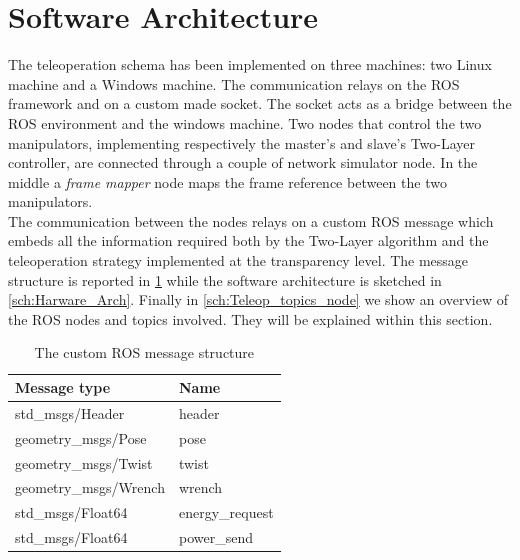 \section{Software Architecture}\label{GeneralArchitecture}
The teleoperation schema has been implemented on three machines: two Linux machine and a Windows machine.
The communication relays on the ROS framework and on a custom made socket.
The socket acts as a bridge between the ROS environment and the windows machine.
Two nodes that control the two manipulators, implementing respectively the master's and slave's Two-Layer controller, are connected through a couple of network simulator node.
In the middle a \textit{frame mapper} node maps the frame reference between the two manipulators.\\
The communication between the nodes relays on a custom ROS message which embeds all the information required both by the Two-Layer algorithm and the teleoperation strategy implemented at the transparency level.
The message structure is reported in \tablename{ \ref{message}} while the software architecture is sketched in \figurename{ \ref{sch:Harware_Arch}}.
Finally in \figurename{ \ref{sch:Teleop_topics_node}} we show an overview of the ROS nodes and topics involved. They will be explained within this section.
\begin{table}
\centering
\begin{tabular}{l l}
	\toprule
	\textbf{Message type} & \textbf{Name} \\ 
	\midrule
	std\_msgs/Header & header \\ 	
	geometry\_msgs/Pose & pose \\ 	
	geometry\_msgs/Twist & twist \\ 	
	geometry\_msgs/Wrench & wrench \\ 	
	std\_msgs/Float64 & energy\_request \\ 	
	std\_msgs/Float64 & power\_send \\ 
	\bottomrule
\end{tabular} 
\caption[The custom ROS message structure]{The custom ROS message structure}
\label{message}
\end{table}

